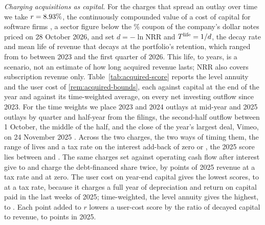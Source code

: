 \noindent\emph{Charging acquisitions as capital.} For the charges that spread an outlay over time we take $r=8.93\%$, the continuously compounded value of a \acqRwAnnual{} cost of capital for software firms \citep{damodaran2026cost}, a sector figure below the \acqCouponMarg\% coupon of the company's dollar notes priced on 28 October 2026, and set $d=-\ln\mathrm{NRR}$ and $T^{\rm life}=1/d$, the decay rate and mean life of revenue that decays at the portfolio's retention, which ranged from \acqNrrLo{} to \acqNrrHi{} between 2023 and the first quarter of 2026. This life, \acqLifeLo{} to \acqLifeHi{} years, is a scenario, not an estimate of how long acquired revenue lasts; NRR also covers subscription revenue only. Table~\ref{tab:acquired-score} reports the level annuity and the user cost of \autoref{rem:acquired-bounds}, each against capital at the end of the year and against its time-weighted average, on every net investing outflow since 2023. For the time weights we place 2023 and 2024 outlays at mid-year and 2025 outlays by quarter and half-year from the filings, the second-half outflow between 1 October, the middle of the half, and the close of the year's largest deal, Vimeo, on 24 November 2025 \citep{bendingspoons2026prospectus}. Across the two charges, the two ways of timing them, the range of lives and a tax rate on the interest add-back of zero or \acqTauIres, the 2025 score lies between \acqConvLo{} and \acqConvHi. The same charges set against operating cash flow after interest give \acqConvLevLo{} to \acqConvLevHi{} and charge the debt-financed share twice, by \acqDoubleTwentyFive{} points of 2025 revenue at a \acqTauIres{} tax rate and \acqDoubleZeroTwentyFive{} at zero. The user cost on year-end capital gives the lowest scores, \acqRUcEndLoTwentyFive{} to \acqRUcEndHiTwentyFive{} at a \acqTauIres{} tax rate, because it charges a full year of depreciation and return on capital paid in the last weeks of 2025; time-weighted, the level annuity gives the highest, \acqRLaAvgLoTwentyFive{} to \acqRLaAvgHiTwentyFive. Each point added to $r$ lowers a user-cost score by the ratio of decayed capital to revenue, \acqKcapLo{} to \acqKcapHi{} points in 2025.

